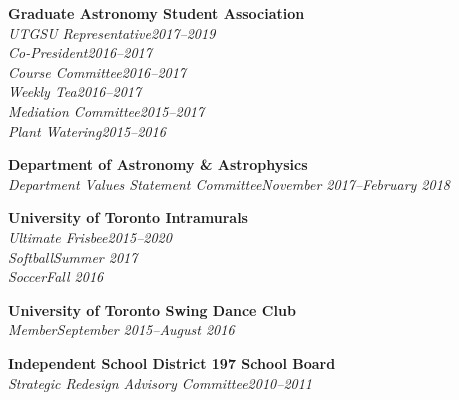 \documentclass[10pt]{res} %
\begin{document}
\begin{resume}
\textbf{Graduate Astronomy Student Association}\\
{\sl UTGSU Representative}\hfill{\sl 2017--2019}\\
{\sl Co-President}\hfill{\sl 2016--2017}\\
{\sl Course Committee}\hfill{\sl 2016--2017}\\
{\sl Weekly Tea}\hfill{\sl 2016--2017}\\
{\sl Mediation Committee}\hfill{\sl 2015--2017}\\
{\sl Plant Watering}\hfill{\sl 2015--2016}

\textbf{Department of Astronomy \& Astrophysics}\\
{\sl Department Values Statement Committee}\hfill{\sl November 2017--February 2018}

\textbf{University of Toronto Intramurals}\\
{\sl Ultimate Frisbee}\hfill{\sl 2015--2020}\\
{\sl Softball}\hfill{\sl Summer 2017}\\
{\sl Soccer}\hfill{\sl Fall 2016}

\textbf{University of Toronto Swing Dance Club}\\
{\sl Member}\hfill{\sl September 2015--August 2016}

\textbf{Independent School District 197 School Board}\\
{\sl Strategic Redesign Advisory Committee}\hfill{\sl 2010--2011}


\end{resume}
\end{document}
